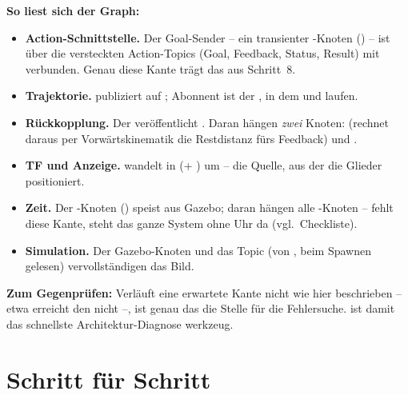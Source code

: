 \noindent\textbf{So liest sich der Graph:}
\begin{itemize}
\item \textbf{Action-Schnittstelle.} Der Goal-Sender -- ein transienter
  -Knoten () -- ist über die
  versteckten Action-Topics  (Goal, Feedback,
  Status, Result) mit  verbunden. Genau diese Kante
  trägt das  aus Schritt~8.
\item \textbf{Trajektorie.}  publiziert auf
  ; Abonnent ist der
  , in dem  und
   laufen.
\item \textbf{Rückkopplung.} Der  veröffentlicht
  . Daran hängen \emph{zwei} Knoten:
   (rechnet daraus per Vorwärtskinematik die
  Restdistanz fürs Feedback) und .
\item \textbf{TF und Anzeige.}  wandelt
   in  (+ ) um -- die Quelle, aus
  der  die Glieder positioniert.
\item \textbf{Zeit.} Der -Knoten ()
  speist  aus Gazebo; daran hängen alle -Knoten
  -- fehlt diese Kante, steht das ganze System ohne Uhr da (vgl.\ Checkliste).
\item \textbf{Simulation.} Der Gazebo-Knoten und das Topic
   (von , beim Spawnen
  gelesen) vervollständigen das Bild.
\end{itemize}
\noindent \textbf{Zum Gegenprüfen:} Verläuft eine erwartete Kante nicht wie hier
beschrieben -- etwa  erreicht den
 nicht --, ist genau das die Stelle für die
Fehlersuche.  ist damit das schnellste Architektur-Diagnose\-%
werkzeug.

\section{Schritt für Schritt}

